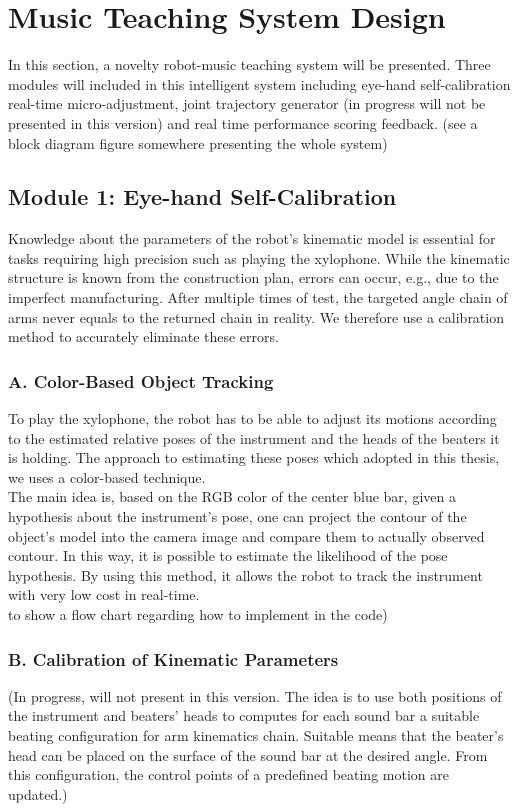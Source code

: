 \section{Music Teaching System Design}
In this section, a novelty robot-music teaching system will be presented. Three 
modules will included in this intelligent system including eye-hand 
self-calibration real-time micro-adjustment, joint trajectory generator (in 
progress will not be presented in this version) and real time performance 
scoring feedback. (see a block diagram figure somewhere presenting the whole 
system)

\subsection{Module 1: Eye-hand Self-Calibration}
Knowledge about the parameters of the robot's kinematic model is essential for 
tasks requiring high precision such as playing the xylophone. While the kinematic 
structure is known from the construction plan, errors can occur, e.g., due to the 
imperfect manufacturing. After multiple times of test, the targeted angle chain 
of arms never equals to the returned chain in reality. We therefore use a 
calibration method to accurately eliminate these errors. 

\subsubsection{A. Color-Based Object Tracking}
To play the xylophone, the robot has to be able to adjust its motions according to
the estimated relative poses of the instrument and the heads of the beaters it is 
holding. The approach to estimating these poses which adopted in this thesis, we 
uses a color-based technique.\\
The main idea is, based on the RGB color of the center blue bar, given a hypothesis 
about the instrument's pose, one can project the contour of the object's model into the 
camera image and compare them to actually observed contour. In this way, it is possible 
to estimate the likelihood of the pose hypothesis. By using this method, it allows
the robot to track the instrument with very low cost in real-time.\\
to show a flow chart regarding how to implement in the code)

\subsubsection{B. Calibration of Kinematic Parameters}
(In progress, will not present in this version. The idea is to use both positions 
of the instrument and beaters' heads to computes for each sound bar a suitable 
beating configuration for arm kinematics chain. Suitable means that the beater's 
head can be placed on the surface of the sound bar at the desired angle. From 
this configuration, the control points of a predefined beating motion are updated.) 


